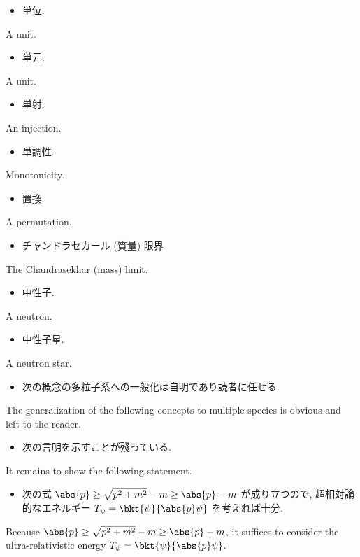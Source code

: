 \documentclass[openany, a4paper, oneside]{jsbook}
\begin{document}
\begin{itemize}
\item 単位.
\end{itemize}
A unit.

\begin{itemize}
\item 単元.
\end{itemize}
A unit.

\begin{itemize}
\item 単射.
\end{itemize}
An injection.

\begin{itemize}
\item 単調性.
\end{itemize}
Monotonicity.

\begin{itemize}
\item 置換.
\end{itemize}
A permutation.

\begin{itemize}
\item チャンドラセカール (質量) 限界 \cite{LiebSeiringer1}
\end{itemize}
The Chandrasekhar (mass) limit.

\begin{itemize}
\item 中性子. \cite{LiebSeiringer1}
\end{itemize}
A neutron.

\begin{itemize}
\item 中性子星. \cite{LiebSeiringer1}
\end{itemize}
A neutron star.

\begin{itemize}
\item 次の概念の多粒子系への一般化は自明であり読者に任せる. \cite{LiebSeiringer1}
\end{itemize}
The generalization of the following concepts to multiple species is obvious and left to the reader.

\begin{itemize}
\item 次の言明を示すことが殘っている.
\end{itemize}
It remains to show the following statement.

\begin{itemize}
\item 次の式 $\abs{p} \geq \sqrt{p^2 + m^2} - m \geq \abs{p} - m$ が成り立つので, 超相対論的なエネルギー
$T_{\psi} = \bkt{\psi}{\abs{p} \psi}$ を考えれば十分. \cite{LiebSeiringer1}
\end{itemize}
Because $\abs{p} \geq \sqrt{p^2 + m^2} - m \geq \abs{p} - m$, it suffices to consider
the ultra-relativistic energy $T_{\psi} = \bkt{\psi}{\abs{p} \psi}$.
\end{document}
